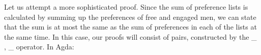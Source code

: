 {\begin{code}
\AgdaSymbol{)}\AgdaSpace{}%
\AgdaSpace{}%
\AgdaSymbol{)}\<%
\\
%
\>[20]\AgdaSpace{}%
\AgdaSymbol{=}\AgdaSpace{}%
\AgdaSpace{}%
\AgdaSpace{}%
\AgdaSymbol{(}\AgdaSpace{}%
\AgdaSymbol{(}\AgdaSpace{}%
\AgdaSymbol{((}\AgdaSpace{}%
\AgdaOperator{\AgdaInductiveConstructor{,}}\AgdaSpace{}%
\AgdaSymbol{)}\AgdaSpace{}%
\AgdaSpace{}%
\AgdaSymbol{)))}\<%
\\
\>[0]%
\>[1490I]\AgdaSymbol{(}\AgdaSpace{}%
\AgdaOperator{\AgdaInductiveConstructor{,}}\AgdaSpace{}%
\AgdaSpace{}%
\AgdaSpace{}%
\AgdaSymbol{)}\<%
\\
\>[.][@{}l@{}]\<[1490I]%
\>[20]\AgdaSymbol{((}\AgdaSpace{}%
\AgdaOperator{\AgdaInductiveConstructor{,}}\AgdaSpace{}%
\AgdaSpace{}%
\AgdaSpace{}%
\AgdaSymbol{)}\AgdaSpace{}%
\AgdaSpace{}%
\AgdaSymbol{)}\<%
\\
%
\>[20]\AgdaSpace{}%
\AgdaSymbol{=}\AgdaSpace{}%
\AgdaSpace{}%
\AgdaSymbol{(}\AgdaSpace{}%
\AgdaSymbol{(}\AgdaSpace{}%
\AgdaSpace{}%
\AgdaOperator{\AgdaPrimitive{+}}\AgdaSpace{}%
\AgdaSpace{}%
\AgdaSymbol{))}\AgdaSpace{}%
\AgdaSpace{}%
\AgdaSymbol{(}\AgdaSpace{}%
\AgdaSymbol{)}\<%
\\
\>[0]\<%
\end{code}

Let us attempt a more sophisticated proof. Since the sum of preference lists is calculated by summing up the preferences of free and engaged men, we can state that the sum is at most the same as the sum of preferences in each of the lists at the same time. In this case, our proofs will consist of pairs, constructed by the \_ , \_ operator. In Agda:

}
